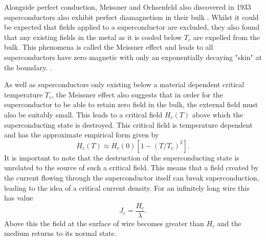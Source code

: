 \documentclass{article}
\numberwithin{equation}{section}
\begin{document}
Alongside perfect conduction, Meissner and Ochsenfeld also discovered in 1933 superconductors also exhibit perfect diamagnetism in their bulk \cite{Poole2014Superconductivity}. Whilst it could be expected that fields applied to a superconductor are excluded, they also found that any existing fields in the metal as it is cooled below $T_c$ are expelled from the bulk. This phenomena is called the Meissner effect and leads to all superconductors have zero magnetic with only an exponentially decaying "skin" at the boundary. \cite{Tinkham2004IntroductionSuperconductivity}.

As well as superconductors only existing below a material dependent critical temperature $T_c$, the Meissner effect also suggests that in order for the superconductor to be able to retain zero field in the bulk, the external field must also be suitably small. This leads to a critical field $H_c(T)$ above which the superconducting state is destroyed. This critical field is temperature dependent and has the approximate empirical form given by \cite{Tinkham2004IntroductionSuperconductivity}
\begin{equation}
    H_c(T) \approx H_c(0)[1 - (T/T_c)^2].
\end{equation}
It is important to note that the destruction of the superconducting state is unrelated to the source of such a critical field. This means that a field created by the current flowing through the superconductor itself can break superconduction, leading to the idea of a critical current density. For an infinitely long wire this has value \cite{Tinkham2004IntroductionSuperconductivity}
\begin{equation}
    J_c = \frac{H_c}{\lambda}.
\end{equation}
Above this the field at the surface of wire becomes greater than $H_c$ and the medium returns to its normal state.
\end{document}
